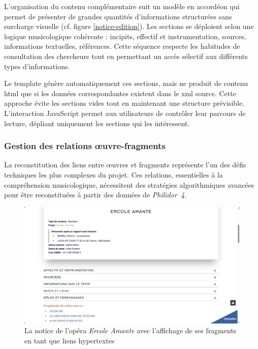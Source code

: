 L'organisation du contenu complémentaire suit un modèle en accordéon qui permet de présenter de grandes quantités d'informations structurées sans surcharge visuelle (cf. figure \ref{notice-edition}). Les sections se déploient selon une logique musicologique cohérente : incipits, effectif et instrumentation, sources, informations textuelles, références. Cette séquence respecte les habitudes de consultation des chercheurs tout en permettant un accès sélectif aux différents types d'informations.

Le template  génère automatiquement ces sections, mais ne produit de contenu \gls{html} que si les données correspondantes existent dans le \gls{xml} source. Cette approche évite les sections vides tout en maintenant une structure prévisible. L'interaction JavaScript permet aux utilisateurs de contrôler leur parcours de lecture, dépliant uniquement les sections qui les intéressent.

\subsubsection{Gestion des relations œuvre-fragments}

La reconstitution des liens entre œuvres et fragments représente l'un des défis techniques les plus complexes du projet. Ces relations, essentielles à la compréhension musicologique, nécessitent des stratégies algorithmiques avancées pour être reconstituées à partir des données de \textit{Philidor~4}.

\begin{figure}[h]
	\caption{La notice de l'opéra \textit{Ercole Amante} avec l'affichage de ses fragments en tant que liens hypertextes} \label{notice-ercole-edition}
	\centering
	\includegraphics[width=\textwidth]{images/ercole-amante-edition-philidor.png}
\end{figure}

